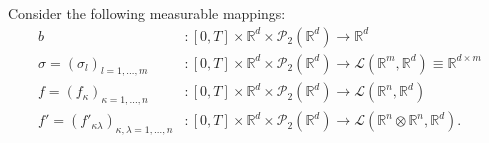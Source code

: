 \documentclass[10pt, a4paper]{article} %
\newcommand{\R}{\mathbb{R}}
\theoremstyle{definition}
\theoremstyle{plain}
\begin{document}
\noindent Consider the following measurable mappings: \begin{align*}
    b &:  [0,T] \times \R^d \times \mathcal{P}_2(\R^d) \to \R^d \\
    \sigma =(\sigma_l)_{l=1,\dots,m} &:   [0,T] \times \R^d \times \mathcal{P}_2(\R^d) \to \mathscr{L}(\R^m,\R^d) \equiv \R^{d \times m} \\
    f = (f_\kappa)_{\kappa=1,\dots,n} &:   [0,T] \times \R^d \times \mathcal{P}_2(\R^d) \to \mathscr{L}(\R^n,\R^d) \\
    f' = (f'_{\kappa \lambda})_{\kappa,\lambda = 1,\dots,n} &:   [0,T] \times \R^d \times \mathcal{P}_2(\R^d) \to \mathscr{L}(\R^n \otimes \R^n,\R^d) .
\end{align*}

\end{document}
